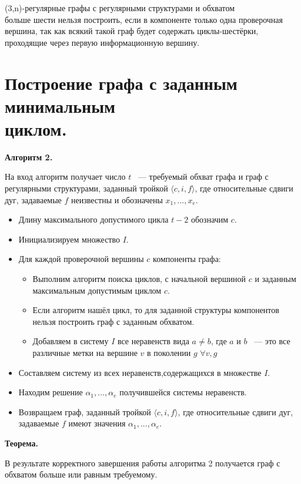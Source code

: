 \documentclass[14pt]{mmcs-article}
\begin{document}
(3,n)-регулярные графы с регулярными структурами и обхватом\\ больше шести нельзя построить, если в компоненте только одна проверочная вершина, так как всякий такой граф будет содержать циклы-шестёрки, проходящие через первую информационную вершину.

\newpage

\section{Построение графа с заданным минимальным\\ циклом.}

\textbf{Алгоритм 2.}

На вход алгоритм получает число $t$ ~--- требуемый обхват графа и граф с регулярными структурами, заданный тройкой $\langle c, i, f \rangle$, где относительные сдвиги дуг, задаваемые $f$ неизвестны и обозначены $x_1, ..., x_e$.  

\begin{itemize}
\item Длину максимального допустимого цикла $t - 2$ обозначим $c$.
\item Инициализируем множество $I$.
\item Для каждой проверочной вершины $c$ компоненты графа:
\begin{itemize}
  \item Выполним алгоритм поиска циклов, с начальной вершиной $c$ и заданным максимальным допустимым циклом $c$.
  \item Если алгоритм нашёл цикл, то для заданной структуры компонентов нельзя построить граф с заданным обхватом.
  \item Добавляем в систему $I$ все неравенств вида $a \neq b$, где $a$ и $b$ ~--- это все различные метки на вершине $v$ в поколении $g$ $\forall v, g$
\end{itemize}
\item Составляем систему из всех неравенств,содержащихся в множестве $I$.
\item Находим решение $\alpha_1, ..., \alpha_e$ получившейся системы неравенств.
\item Возвращаем граф, заданный тройкой $\langle c, i, f \rangle$, где относительные сдвиги дуг, задаваемые $f$ имеют значения $\alpha_1, ..., \alpha_e$.
\end{itemize}

\textbf{Теорема.}

В результате корректного завершения работы алгоритма 2 получается граф с обхватом больше или равным требуемому.
\end{document}
